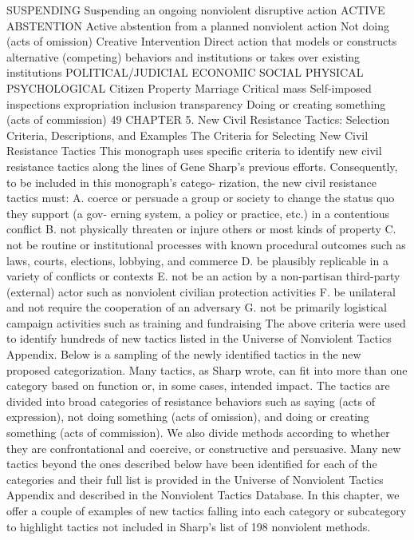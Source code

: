 \documentclass[twoside,a4paper,12pt,fleqn,openany]{extbook}
\begin{document}
SUSPENDING
Suspending an
ongoing nonviolent
disruptive action
ACTIVE ABSTENTION
Active abstention from a
planned nonviolent action
Not doing
(acts of
omission)
Creative Intervention
Direct action that models or constructs alternative (competing) behaviors
and institutions or takes over existing institutions
POLITICAL/JUDICIAL
 ECONOMIC
 SOCIAL
 PHYSICAL
 PSYCHOLOGICAL
Citizen
 Property
 Marriage
 Critical mass
 Self-imposed
inspections
 expropriation
 inclusion
 transparency
Doing
or creating
something
(acts of
commission)
49
CHAPTER 5. New Civil Resistance Tactics:
Selection Criteria, Descriptions, and Examples
The Criteria for Selecting New Civil Resistance Tactics
This monograph uses specific criteria to identify new civil resistance tactics along the lines
of Gene Sharp’s previous efforts. Consequently, to be included in this monograph’s catego-
rization, the new civil resistance tactics must:
A.	 coerce or persuade a group or society to change the status quo they support (a gov-
erning system, a policy or practice, etc.) in a contentious conflict
B.	 not physically threaten or injure others or most kinds of property
C.	 not be routine or institutional processes with known procedural outcomes such as
laws, courts, elections, lobbying, and commerce
D.	 be plausibly replicable in a variety of conflicts or contexts
E.	 not be an action by a non-partisan third-party (external) actor such as nonviolent
civilian protection activities
F.	 be unilateral and not require the cooperation of an adversary
G.	 not be primarily logistical campaign activities such as training and fundraising
The above criteria were used to identify hundreds of new tactics listed in the Universe
of Nonviolent Tactics Appendix. Below is a sampling of the newly identified tactics in the new
proposed categorization. Many tactics, as Sharp wrote, can fit into more than one category
based on function or, in some cases, intended impact.
The tactics are divided into broad categories of resistance behaviors such as saying (acts
of expression), not doing something (acts of omission), and doing or creating something (acts
of commission). We also divide methods according to whether they are confrontational and
coercive, or constructive and persuasive. Many new tactics beyond the ones described below
have been identified for each of the categories and their full list is provided in the Universe
of Nonviolent Tactics Appendix and described in the Nonviolent Tactics Database.
In this chapter, we offer a couple of examples of new tactics falling into each category
or subcategory to highlight tactics not included in Sharp’s list of 198 nonviolent methods.
\end{document}
